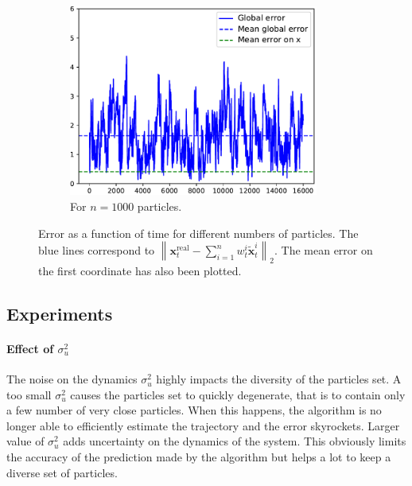 \documentclass[english, DIV=13]{scrartcl}
\newcommand\norm[1]{\left\lVert#1\right\rVert}
\begin{document}
\begin{figure}
\begin{subfigure}{0.49\textwidth}
        \includegraphics[width=0.9\textwidth]{figures/error-1000}
        \caption{For $n=1000$ particles.} 
        \label{fig:q3-error-1000}
    \end{subfigure}
    \caption{Error as a function of time for different numbers of particles. The blue
    lines correspond to
    $\norm{\mathbf{x}_t^{\text{real}} - \sum_{i=1}^n w_t^i\tilde{\mathbf{x}}_t^i}_2$.
    The mean error on the first coordinate has also been plotted.}
\end{figure}

\subsection{Experiments}
\label{sec:exp}
\paragraph{Effect of $\sigma^2_u$}
The noise on the dynamics $\sigma^2_u$ highly impacts the diversity of the particles set.
A too small $\sigma^2_u$ causes the particles set to quickly degenerate, that is to
contain only a few number of very close particles. When this happens, the algorithm is
no longer able to efficiently estimate the trajectory and the error skyrockets. Larger
value of $\sigma^2_u$ adds uncertainty on the dynamics of the system. This obviously
limits the accuracy of the prediction made by the algorithm but helps a lot to keep
a diverse set of particles.
\end{document}
